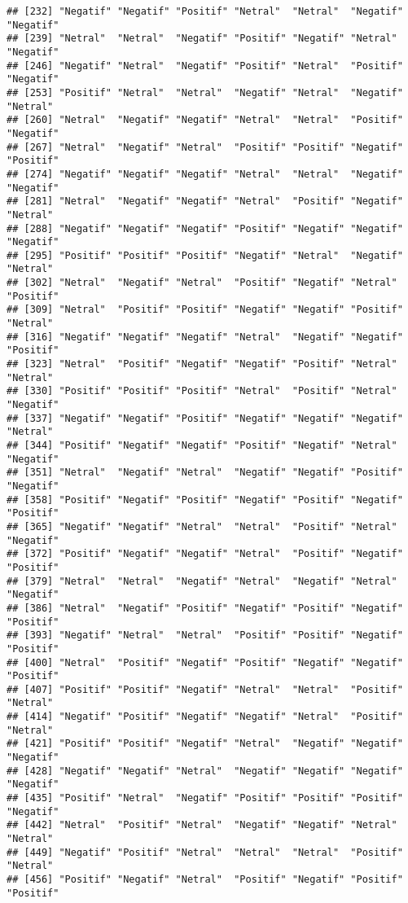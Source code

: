 \documentclass[
]{article}
\begin{document}
\begin{verbatim}
## [232] "Negatif" "Negatif" "Positif" "Netral"  "Netral"  "Negatif" "Negatif"
## [239] "Netral"  "Netral"  "Negatif" "Positif" "Negatif" "Netral"  "Negatif"
## [246] "Negatif" "Netral"  "Negatif" "Positif" "Netral"  "Positif" "Negatif"
## [253] "Positif" "Netral"  "Netral"  "Negatif" "Netral"  "Negatif" "Netral" 
## [260] "Netral"  "Negatif" "Negatif" "Netral"  "Netral"  "Positif" "Negatif"
## [267] "Netral"  "Negatif" "Netral"  "Positif" "Positif" "Negatif" "Positif"
## [274] "Negatif" "Negatif" "Negatif" "Netral"  "Netral"  "Negatif" "Negatif"
## [281] "Netral"  "Negatif" "Negatif" "Netral"  "Positif" "Negatif" "Netral" 
## [288] "Negatif" "Negatif" "Negatif" "Positif" "Negatif" "Negatif" "Negatif"
## [295] "Positif" "Positif" "Positif" "Negatif" "Netral"  "Negatif" "Netral" 
## [302] "Netral"  "Negatif" "Netral"  "Positif" "Negatif" "Netral"  "Positif"
## [309] "Netral"  "Positif" "Positif" "Negatif" "Negatif" "Positif" "Netral" 
## [316] "Negatif" "Negatif" "Negatif" "Netral"  "Negatif" "Negatif" "Positif"
## [323] "Netral"  "Positif" "Negatif" "Negatif" "Positif" "Netral"  "Netral" 
## [330] "Positif" "Positif" "Positif" "Netral"  "Positif" "Netral"  "Negatif"
## [337] "Negatif" "Negatif" "Positif" "Negatif" "Negatif" "Negatif" "Netral" 
## [344] "Positif" "Negatif" "Negatif" "Positif" "Negatif" "Netral"  "Negatif"
## [351] "Netral"  "Negatif" "Netral"  "Negatif" "Negatif" "Positif" "Negatif"
## [358] "Positif" "Negatif" "Positif" "Negatif" "Positif" "Negatif" "Positif"
## [365] "Negatif" "Negatif" "Netral"  "Netral"  "Positif" "Netral"  "Negatif"
## [372] "Positif" "Negatif" "Negatif" "Netral"  "Positif" "Negatif" "Positif"
## [379] "Netral"  "Netral"  "Negatif" "Netral"  "Negatif" "Netral"  "Negatif"
## [386] "Netral"  "Negatif" "Positif" "Negatif" "Positif" "Negatif" "Positif"
## [393] "Negatif" "Netral"  "Netral"  "Positif" "Positif" "Negatif" "Positif"
## [400] "Netral"  "Positif" "Negatif" "Positif" "Negatif" "Negatif" "Positif"
## [407] "Positif" "Positif" "Negatif" "Netral"  "Netral"  "Positif" "Netral" 
## [414] "Negatif" "Positif" "Negatif" "Negatif" "Netral"  "Positif" "Netral" 
## [421] "Positif" "Positif" "Negatif" "Netral"  "Negatif" "Negatif" "Negatif"
## [428] "Negatif" "Negatif" "Netral"  "Negatif" "Negatif" "Negatif" "Negatif"
## [435] "Positif" "Netral"  "Negatif" "Positif" "Positif" "Positif" "Negatif"
## [442] "Netral"  "Positif" "Netral"  "Negatif" "Negatif" "Netral"  "Netral" 
## [449] "Negatif" "Positif" "Netral"  "Netral"  "Netral"  "Positif" "Netral" 
## [456] "Positif" "Negatif" "Netral"  "Positif" "Negatif" "Positif" "Positif"

\end{verbatim}
\end{document}
